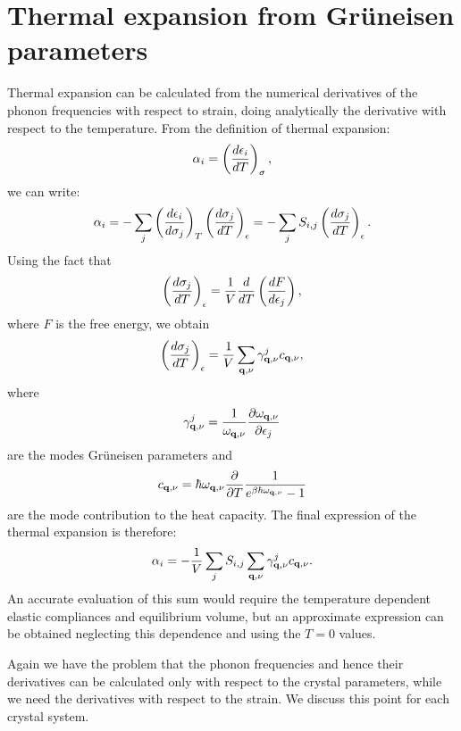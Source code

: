 \documentclass[12pt,a4paper]{article}
\begin{document}
\section{\color{coral}Thermal expansion from Gr\"uneisen parameters}
Thermal expansion can be calculated from the numerical derivatives of the 
phonon frequencies with respect to strain, doing analytically the
derivative with respect to the temperature.
From the definition of thermal expansion:
\begin{equation}
\alpha_i= \left( {d \epsilon_i \over d T}\right)_{\sigma},
\end{equation}
we can write:
\begin{equation}
\alpha_i= - \sum_j \left({d \epsilon_i \over d \sigma_j}\right)_{T} 
\left({d \sigma_j \over d T} \right)_{\epsilon} = - \sum_j S_{i,j}
\left({d \sigma_j \over d T} \right)_{\epsilon}.
\end{equation}
Using the fact that 
\begin{equation}
\left({d \sigma_j \over d T} \right)_{\epsilon} = {1\over V} {d \over d T} \left( {d F \over d \epsilon_j}\right),
\end{equation}
where $F$ is the free energy, we obtain 
\begin{equation}
\left({d \sigma_j \over d T} \right)_{\epsilon} = {1\over V} \sum_{{\bf q},\nu}
\gamma_{{\bf q},\nu}^j c_{{\bf q},\nu},
\end{equation}
where
\begin{equation}
\gamma_{{\bf q},\nu}^j = {1\over \omega_{{\bf q},\nu}} {\partial
\omega_{{\bf q},\nu} \over \partial \epsilon_j} 
\end{equation}
are the modes Gr\"uneisen parameters and 
\begin{equation}
c_{{\bf q},\nu} = {\hbar \omega_{{\bf q},\nu}} {\partial
\over \partial T } {1 \over e^{\beta \hbar \omega_{{\bf q},\nu}} - 1}
\end{equation}
are the mode contribution to the heat capacity.
The final expression of the thermal expansion is therefore:
\begin{equation}
\alpha_i = -{1\over V} \sum_j S_{i,j} \sum_{{\bf q},\nu}
\gamma_{{\bf q},\nu}^j c_{{\bf q},\nu}.
\end{equation}
An accurate evaluation of this sum would require the temperature dependent
elastic compliances and equilibrium volume, but an approximate expression 
can be obtained neglecting this dependence and using the $T=0$ values. 

Again we have the problem that the phonon frequencies and hence their
derivatives can be calculated only with respect to the crystal parameters,
while we need the derivatives with respect to the strain. We discuss
this point for each crystal system.
\end{document}
